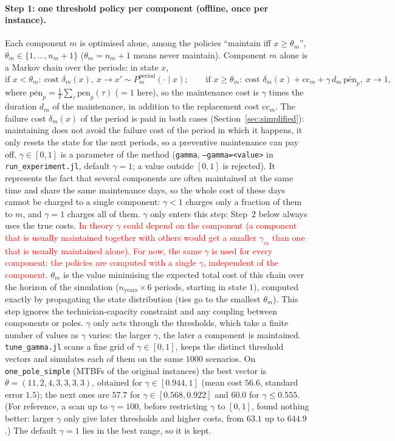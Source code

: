 \documentclass[11pt]{article}
\begin{document}
\paragraph{Step 1: one threshold policy per component (offline, once per instance).}
Each component $m$ is optimised alone, among the policies ``maintain iff $x \ge \theta_m$'',
$\theta_m \in \{1,\dots,n_m+1\}$ ($\theta_m = n_m+1$ means never maintain). Component $m$ alone
is a Markov chain over the periods: in state $x$,
\[
  \text{if } x < \theta_m:\ \text{cost } \delta_m(x),\ x \to x' \sim P^{\mathrm{period}}_m(\cdot \mid x);
  \qquad
  \text{if } x \ge \theta_m:\ \text{cost } \delta_m(x) + \mathrm{cc}_m + \gamma\, d_m\,\bar{\mathrm{pen}}_p,\ x \to 1,
\]
where $\bar{\mathrm{pen}}_p = \frac1T\sum_\tau \mathrm{pen}_p(\tau)$ ($=1$ here), so the
maintenance cost is $\gamma$ times the duration $d_m$ of the maintenance, in addition to the
replacement cost $\mathrm{cc}_m$. The failure cost $\delta_m(x)$ of the period is paid in both
cases (Section~\ref{sec:simplified}): maintaining does not avoid the failure cost of the
period in which it happens, it only resets the state for the next periods, so a preventive
maintenance can pay off.
$\gamma \in [0,1]$ is a parameter of the method (\texttt{gamma}, \texttt{--gamma=<value>} in
\texttt{run\_experiment.jl}, default $\gamma = 1$; a value outside $[0,1]$ is rejected). It
represents the fact that several components are often maintained at the same time and share
the same maintenance days, so the whole cost of these days cannot be charged to a single
component: $\gamma < 1$ charges only a fraction of them to $m$, and $\gamma = 1$ charges all
of them. $\gamma$ only enters this step: Step~2 below always uses the true costs.
\textcolor{red}{In theory $\gamma$ could depend on the component (a component that is
usually maintained together with others would get a smaller $\gamma_m$ than one that is
usually maintained alone). For now, the same $\gamma$ is used for every component: the
policies are computed with a single $\gamma$, independent of the component.}
$\theta_m$ is the
value minimising the expected total cost of this chain over the horizon of the simulation
($n_{\mathrm{years}} \times 6$ periods, starting in state $1$), computed exactly by propagating
the state distribution (ties go to the smallest $\theta_m$). This step ignores the
technician-capacity constraint and any coupling between components or poles.
$\gamma$ only acts through the thresholds, which take a finite number of values as $\gamma$
varies: the larger $\gamma$, the later a component is maintained. \texttt{tune\_gamma.jl}
scans a fine grid of $\gamma \in [0,1]$, keeps the distinct threshold vectors and simulates
each of them on the same $1000$ scenarios. On \texttt{one\_pole\_simple} (MTBFs of the
original instances) the best vector is $\theta = (11,2,4,3,3,3,3)$, obtained for
$\gamma \in [0.944, 1]$ (mean cost $56.6$, standard error $1.5$); the next ones are $57.7$
for $\gamma \in [0.568, 0.922]$ and $60.0$ for $\gamma \le 0.555$. (For reference, a scan up
to $\gamma = 100$, before restricting $\gamma$ to $[0,1]$, found nothing better: larger
$\gamma$ only give later thresholds and higher costs, from $63.1$ up to $644.9$.) The
default $\gamma = 1$ lies in the best range, so it is kept.
\end{document}

